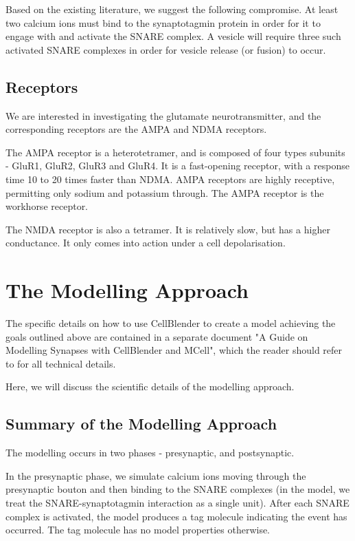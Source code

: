 \documentclass[a4paper]{article}
\begin{document}
Based on the existing literature, we suggest the following compromise. At least two calcium ions must bind to the synaptotagmin protein in order for it to engage with and activate the SNARE complex. A vesicle will require three such activated SNARE complexes in order for vesicle release (or fusion) to occur.

\subsection{Receptors}
We are interested in investigating the glutamate neurotransmitter, and the corresponding receptors are the AMPA and NDMA receptors.

The AMPA receptor is a heterotetramer, and is composed of four types subunits - GluR1, GluR2, GluR3 and GluR4. It is a fast-opening receptor, with a response time 10 to 20 times faster than NDMA. AMPA receptors are highly receptive, permitting only sodium and potassium through. The AMPA receptor is the workhorse receptor.

The NMDA receptor is also a tetramer. It is relatively slow, but has a higher conductance. It only comes into action under a cell depolarisation.

\section{The Modelling Approach}

The specific details on how to use CellBlender to create a model achieving the goals outlined above are contained in a separate document "A Guide on Modelling Synapses with CellBlender and MCell", which the reader should refer to for all technical details.

Here, we will discuss the scientific details of the modelling approach.

\subsection{Summary of the Modelling Approach}
The modelling occurs in two phases - presynaptic, and postsynaptic.

In the presynaptic phase, we simulate calcium ions moving through the presynaptic bouton and then binding to the SNARE complexes (in the model, we treat the SNARE-synaptotagmin interaction as a single unit). After each SNARE complex is activated, the model produces a tag molecule indicating the event has occurred. The tag molecule has no model properties otherwise.
\end{document}
